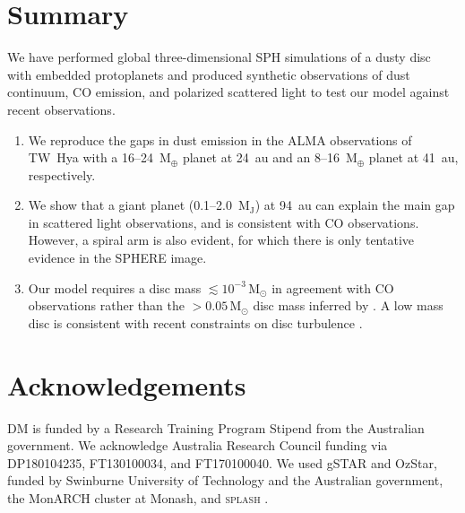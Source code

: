 \documentclass[usenatbib,a4paper,times]{mnras}
\renewcommand{\sun}{\mathrm{M}_{\odot}}
\renewcommand{\earth}{\mathrm{M}_{\oplus}}
\begin{document}
\section{Summary}
\label{sec:summary}

We have performed global three-dimensional SPH simulations of a dusty disc with
embedded protoplanets and produced synthetic observations of dust continuum, CO
emission, and polarized scattered light to test our model against recent
observations.

\begin{enumerate}
   \item We reproduce the gaps in dust emission in the ALMA observations of
      TW~Hya with a 16--24~$\earth{}$ planet at 24~au and an 8--16~$\earth{}$
      planet at 41~au, respectively.
   \item We show that a giant planet (0.1--2.0~$\mathrm{M_J}$) at 94~au can
      explain the main gap in scattered light observations, and is consistent
      with CO observations. However, a spiral arm is also evident, for which
      there is only tentative evidence in the SPHERE image.
   \item Our model requires a disc mass $\lesssim10^{-3}\,\sun{}$ in agreement
      with CO observations rather than the $>0.05\,\sun{}$ disc mass inferred
      by \citet{bergin:2013}. A low mass disc is consistent with recent
      constraints on disc turbulence \citep{flaherty:2018}.
\end{enumerate}










\section*{Acknowledgements}

DM is funded by a Research Training Program Stipend from the Australian
government. We acknowledge Australia Research Council funding via DP180104235,
FT130100034, and FT170100040. We used gSTAR and OzStar, funded by Swinburne
University of Technology and the Australian government, the MonARCH cluster at
Monash, and \textsc{splash} \citep{price:2007}.



\label{lastpage}
\end{document}
